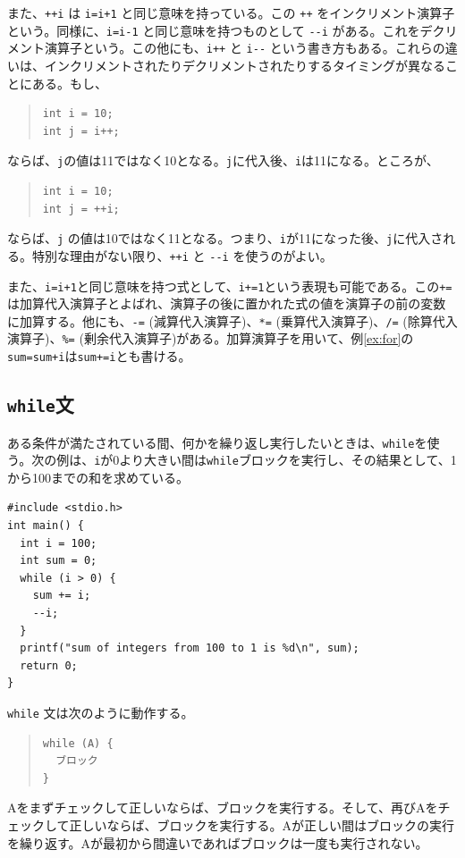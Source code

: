 また、\verb|++i| は \verb|i=i+1| と同じ意味を持っている。この \verb|++| をインクリメント演算子という。同様に、\verb|i=i-1| と同じ意味を持つものとして \verb|--i| がある。これをデクリメント演算子という。この他にも、\verb|i++| と \verb|i--| という書き方もある。これらの違いは、インクリメントされたりデクリメントされたりするタイミングが異なることにある。もし、
%
\begin{quote}
\begin{verbatim}
int i = 10;
int j = i++;
\end{verbatim}
\end{quote}
%
ならば、\verb|j|の値は11ではなく10となる。\verb|j|に代入後、\verb|i|は11になる。ところが、
%
\begin{quote}
\begin{verbatim}
int i = 10;
int j = ++i;
\end{verbatim}
\end{quote}
%
ならば、\verb|j| の値は10ではなく11となる。つまり、\verb|i|が11になった後、\verb|j|に代入される。特別な理由がない限り、\verb|++i| と \verb|--i| を使うのがよい。

また、\verb|i=i+1|と同じ意味を持つ式として、\verb|i+=1|という表現も可能である。この\verb|+=|は加算代入演算子とよばれ、演算子の後に置かれた式の値を演算子の前の変数に加算する。他にも、\verb|-=| (減算代入演算子)、\verb|*=| (乗算代入演算子)、\verb|/=| (除算代入演算子)、\verb|%=| (剰余代入演算子)がある。加算演算子を用いて、例\ref{ex:for}の\verb|sum=sum+i|は\verb|sum+=i|とも書ける。

\subsection{{\tt while}文}
ある条件が満たされている間、何かを繰り返し実行したいときは、\verb|while|を使う。次の例は、\verb|i|が0より大きい間は\verb|while|ブロックを実行し、その結果として、1から100までの和を求めている。
%
\begin{reidai}\label{ex:while}
\begin{verbatim}
#include <stdio.h>
int main() {
  int i = 100;
  int sum = 0;
  while (i > 0) {
    sum += i;
    --i;
  }
  printf("sum of integers from 100 to 1 is %d\n", sum);
  return 0;
}
\end{verbatim}
\end{reidai} \noindent
%
\verb|while| 文は次のように動作する。
%
\begin{quote}
\begin{verbatim}
while (A) {
  ブロック
}
\end{verbatim}
\end{quote}
%
Aをまずチェックして正しいならば、ブロックを実行する。そして、再びAをチェックして正しいならば、ブロックを実行する。Aが正しい間はブロックの実行を繰り返す。Aが最初から間違いであればブロックは一度も実行されない。

